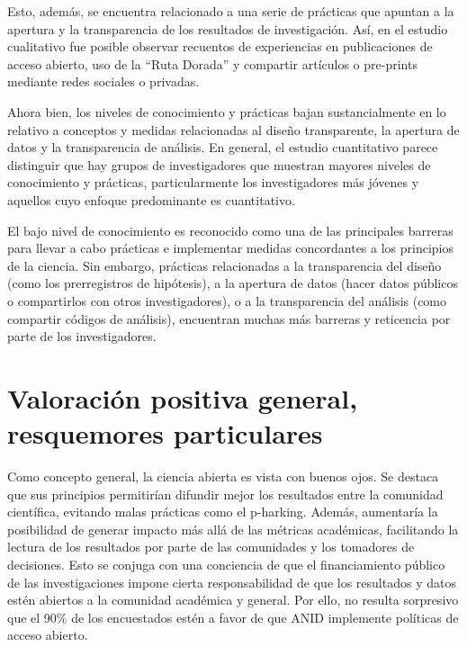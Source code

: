 \documentclass[
  letterpaper,
  DIV=11,
  numbers=noendperiod]{scrreprt}
\begin{document}
Esto, además, se encuentra relacionado a una serie de prácticas que
apuntan a la apertura y la transparencia de los resultados de
investigación. Así, en el estudio cualitativo fue posible observar
recuentos de experiencias en publicaciones de acceso abierto, uso de la
``Ruta Dorada'' y compartir artículos o pre-prints mediante redes
sociales o privadas.

Ahora bien, los niveles de conocimiento y prácticas bajan
sustancialmente en lo relativo a conceptos y medidas relacionadas al
diseño transparente, la apertura de datos y la transparencia de
análisis. En general, el estudio cuantitativo parece distinguir que hay
grupos de investigadores que muestran mayores niveles de conocimiento y
prácticas, particularmente los investigadores más jóvenes y aquellos
cuyo enfoque predominante es cuantitativo.

El bajo nivel de conocimiento es reconocido como una de las principales
barreras para llevar a cabo prácticas e implementar medidas concordantes
a los principios de la ciencia. Sin embargo, prácticas relacionadas a la
transparencia del diseño (como los prerregistros de hipótesis), a la
apertura de datos (hacer datos públicos o compartirlos con otros
investigadores), o a la transparencia del análisis (como compartir
códigos de análisis), encuentran muchas más barreras y reticencia por
parte de los investigadores.

\hypertarget{valoraciuxf3n-positiva-general-resquemores-particulares}{%
\section{Valoración positiva general, resquemores
particulares}\label{valoraciuxf3n-positiva-general-resquemores-particulares}}

Como concepto general, la ciencia abierta es vista con buenos ojos. Se
destaca que sus principios permitirían difundir mejor los resultados
entre la comunidad científica, evitando malas prácticas como el
p-harking. Además, aumentaría la posibilidad de generar impacto más allá
de las métricas académicas, facilitando la lectura de los resultados por
parte de las comunidades y los tomadores de decisiones. Esto se conjuga
con una conciencia de que el financiamiento público de las
investigaciones impone cierta responsabilidad de que los resultados y
datos estén abiertos a la comunidad académica y general. Por ello, no
resulta sorpresivo que el 90\% de los encuestados estén a favor de que
ANID implemente políticas de acceso abierto.
\end{document}
